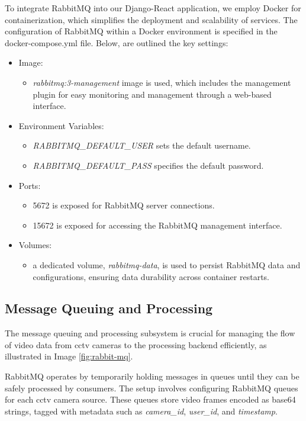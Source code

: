 To integrate RabbitMQ into our Django-React application, we employ Docker for containerization, which simplifies the 
deployment and scalability of services. The configuration of RabbitMQ within a Docker environment is specified in the 
docker-compose.yml file. Below, are outlined the key settings:
\begin{itemize}
    \item Image: 
        \begin{itemize}
            \item \textit{rabbitmq:3-management} image is used, which includes the management plugin for easy monitoring and management through a web-based interface.
        \end{itemize}
    \item Environment Variables:
        \begin{itemize}
            \item \textit{RABBITMQ\_DEFAULT\_USER} sets the default username.
            \item \textit{RABBITMQ\_DEFAULT\_PASS} specifies the default password.
        \end{itemize}
    \item Ports:
        \begin{itemize}
            \item 5672 is exposed for RabbitMQ server connections.
            \item 15672 is exposed for accessing the RabbitMQ management interface.
        \end{itemize}
    \item Volumes:
        \begin{itemize}
            \item a dedicated volume, \textit{rabbitmq-data}, is used to persist RabbitMQ data and configurations, ensuring data durability across container restarts.
        \end{itemize}
\end{itemize}


\subsection{Message Queuing and Processing}
The message queuing and processing subsystem is crucial for managing the flow of video data from \ac{cctv} cameras to 
the processing backend efficiently, as illustrated in Image \ref{fig:rabbit-mq}. 

RabbitMQ operates by temporarily holding messages in queues until they can be safely processed by consumers. The setup 
involves configuring RabbitMQ queues for each \ac{cctv} camera source. These queues store video 
frames encoded as base64 strings, tagged with metadata such as \textit{camera\_id}, \textit{user\_id}, and \textit{timestamp}.

